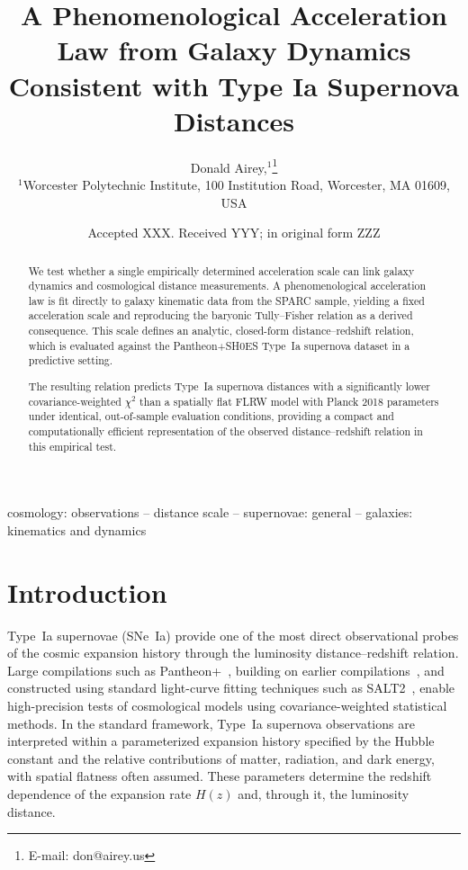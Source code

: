\documentclass[fleqn,usenatbib]{mnras}
\title[Short title, max. 45 characters]{A Phenomenological Acceleration Law from Galaxy Dynamics Consistent with Type Ia Supernova Distances}
\author[Donald Airey]{
Donald Airey,$^{1}$\thanks{E-mail: don@airey.us}
\\
$^{1}$Worcester Polytechnic Institute, 100 Institution Road, Worcester, MA 01609, USA\\
}
\date{Accepted XXX. Received YYY; in original form ZZZ}
\begin{document}
\label{firstpage}
\pagerange{\pageref{firstpage}--\pageref{lastpage}}
\maketitle

\begin{abstract}
We test whether a single empirically determined acceleration scale can link galaxy dynamics and cosmological distance measurements. A phenomenological acceleration law is fit directly to galaxy kinematic data from the SPARC sample, yielding a fixed acceleration scale and reproducing the baryonic Tully--Fisher relation as a derived consequence. This scale defines an analytic, closed-form distance--redshift relation, which is evaluated against the Pantheon+SH0ES Type~Ia supernova dataset in a predictive setting.

The resulting relation predicts Type~Ia supernova distances with a significantly lower covariance-weighted $\chi^2$ than a spatially flat FLRW model with Planck 2018 parameters under identical, out-of-sample evaluation conditions, providing a compact and computationally efficient representation of the observed distance--redshift relation in this empirical test.
\end{abstract}

\begin{keywords}
cosmology: observations -- distance scale -- supernovae: general -- galaxies: kinematics and dynamics
\end{keywords}


\section{Introduction}

Type~Ia supernovae (SNe~Ia) provide one of the most direct observational probes of the cosmic expansion history through the luminosity distance--redshift relation. Large compilations such as Pantheon+~\cite{Brout2022}, building on earlier compilations~\cite{Scolnic2018}, and constructed using standard light-curve fitting techniques such as SALT2~\cite{Guy2007}, enable high-precision tests of cosmological models using covariance-weighted statistical methods. In the standard framework, Type~Ia supernova observations are interpreted within a parameterized expansion history specified by the Hubble constant and the relative contributions of matter, radiation, and dark energy, with spatial flatness often assumed. These parameters determine the redshift dependence of the expansion rate $H(z)$ and, through it, the luminosity distance.
\end{document}
